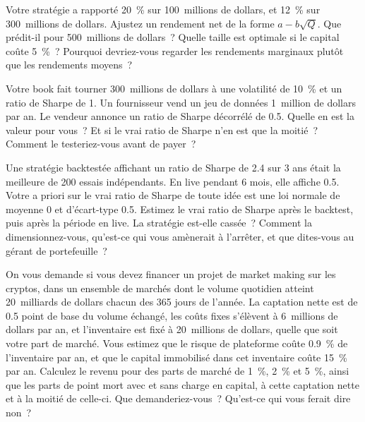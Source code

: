 \begin{question}\label{iq:iv2:research-and-strategy-cases:36}
Votre stratégie a rapporté 20~\% sur 100~millions de dollars, et 12~\% sur 300~millions de dollars. Ajustez un rendement net de la forme $a - b\sqrt{Q}$. Que prédit-il pour 500~millions de dollars~? Quelle taille est optimale si le capital coûte 5~\%~? Pourquoi devriez-vous regarder les rendements marginaux plutôt que les rendements moyens~?
\end{question}

\begin{question}\label{iq:iv2:research-and-strategy-cases:37}
Votre book fait tourner 300~millions de dollars à une volatilité de 10~\% et un ratio de Sharpe de 1. Un fournisseur vend un jeu de données 1~million de dollars par an. Le vendeur annonce un ratio de Sharpe décorrélé de 0.5. Quelle en est la valeur pour vous~? Et si le vrai ratio de Sharpe n'en est que la moitié~? Comment le testeriez-vous avant de payer~?
\end{question}

\begin{question}\label{iq:iv2:research-and-strategy-cases:38}
Une stratégie backtestée affichant un ratio de Sharpe de 2.4 sur 3 ans était la meilleure de 200 essais indépendants. En live pendant 6 mois, elle affiche 0.5. Votre a priori sur le vrai ratio de Sharpe de toute idée est une loi normale de moyenne 0 et d'écart-type 0.5. Estimez le vrai ratio de Sharpe après le backtest, puis après la période en live. La stratégie est-elle cassée~? Comment la dimensionnez-vous, qu'est-ce qui vous amènerait à l'arrêter, et que dites-vous au gérant de portefeuille~?
\end{question}

\begin{question}\label{iq:iv2:research-and-strategy-cases:39}
On vous demande si vous devez financer un projet de market making sur les cryptos, dans un ensemble de marchés dont le volume quotidien atteint 20~milliards de dollars chacun des 365 jours de l'année. La captation nette est de 0.5 point de base du volume échangé, les coûts fixes s'élèvent à 6~millions de dollars par an, et l'inventaire est fixé à 20~millions de dollars, quelle que soit votre part de marché. Vous estimez que le risque de plateforme coûte 0.9~\% de l'inventaire par an, et que le capital immobilisé dans cet inventaire coûte 15~\% par an. Calculez le revenu pour des parts de marché de 1~\%, 2~\% et 5~\%, ainsi que les parts de point mort avec et sans charge en capital, à cette captation nette et à la moitié de celle-ci. Que demanderiez-vous~? Qu'est-ce qui vous ferait dire non~?
\end{question}

